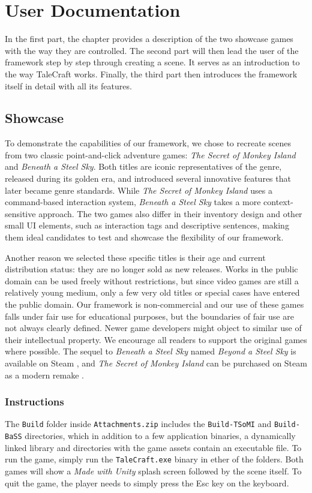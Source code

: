 \chapter{User Documentation}
In the first part, the chapter provides a description of the two showcase games with the way they are controlled. The second part will then lead the user of the framework step by step through creating a scene. It serves as an introduction to the way TaleCraft works. Finally, the third part then introduces the framework itself in detail with all its features.


\section{Showcase}
To demonstrate the capabilities of our framework, we chose to recreate scenes from two classic point-and-click adventure games: \textit{The Secret of Monkey Island} and \textit{Beneath a Steel Sky}. Both titles are iconic representatives of the genre, released during its golden era, and introduced several innovative features that later became genre standards. While \textit{The Secret of Monkey Island} uses a command-based interaction system, \textit{Beneath a Steel Sky} takes a more context-sensitive approach. The two games also differ in their inventory design and other small UI elements, such as interaction tags and descriptive sentences, making them ideal candidates to test and showcase the flexibility of our framework.

Another reason we selected these specific titles is their age and current distribution status: they are no longer sold as new releases. Works in the public domain can be used freely without restrictions, but since video games are still a relatively young medium, only a few very old titles or special cases have entered the public domain.
Our framework is non-commercial and our use of these games falls under fair use for educational purposes, but the boundaries of fair use are not always clearly defined. 
Newer game developers might object to similar use of their intellectual property. We encourage all readers to support the original games where possible. The sequel to \textit{Beneath a Steel Sky} named \textit{Beyond a Steel Sky} is available on Steam \cite{Beyond-a-Steel-Sky}, and \textit{The Secret of Monkey Island} can be purchased on Steam as a modern remake \cite{TSoMI-steam}.

\subsection{Instructions}
The \verb|Build| folder inside \verb|Attachments.zip| includes the \verb|Build-TSoMI| and \verb|Build-BaSS| directories, which in addition to a few application binaries, a dynamically linked library and directories with the game assets contain an executable file. To run the game, simply run the \verb|TaleCraft.exe| binary in ether of the folders. Both games will show a \textit{Made with Unity }splash screen followed by the scene itself. To quit the game, the player needs to simply press the Esc key on the keyboard.

